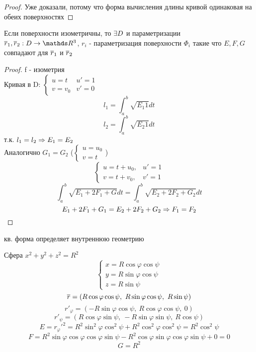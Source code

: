 \documentclass[12pt, fleqn]{article}
\begin{document}
  \begin{proof}
    Уже доказали, потому что форма вычисления длины кривой одинаковая на обеих поверхностях
  \end{proof}

  \begin{remark}
    Если поверхности изометричны, то $\exists D$ и параметризации $\ol{r}_1, \ol{r}_2: D \ra \R^3$, $r_i$ - параметризация поверхности $\Phi_i$ такие что $E,F,G$ совпадают для $\overline{r}_1$ и $\overline{r}_2$
  \end{remark}

  \begin{proof}
    f - изометрия\\
    Кривая в D: $\begin{cases}
      u = t & u'=1\\
      v=v_0  & v'=0
    \end{cases}$
    \[l_1 = \int_a^b \sqrt{E_1 1} dt\]
    \[l_2 = \int_a^b \sqrt{E_2 1} dt\]
    т.к. $l_1 = l_2 \Rightarrow E_1 = E_2$\\
    Аналогично $G_1 = G_2$ ($\begin{cases}
      u=u_0\\
      v=t
    \end{cases}$)
    \[\begin{cases}
      u = t + u_0, & u' = 1\\
      v = t + v_0, & v' = 1
    \end{cases}\]
    \[\int_a^b \sqrt{E_1 + 2 F_1 + G} dt = \int_a^b \sqrt{E_2 + 2F_2 + G_2} dt\]
    \[E_1 + 2F_1 + G_1 = E_2+ 2 F_2 + G_2 \Rightarrow F_1 = F_2\]
  \end{proof}

  \begin{consequence}
     кв. форма определяет внутреннюю геометрию
  \end{consequence}


  \begin{example}
    Сфера $x^2 + y^2 + z^2 = R^2$
    \[\begin{cases}
      x = R \cos\varphi \cos\psi\\
      y = R \sin\varphi \cos\psi\\
      z = R \sin\psi
    \end{cases}\]
    \[\overline{r} = (R \cos\varphi \cos\psi,\ R\sin\varphi \cos\psi,\ R \sin\psi)\]
    \[r'_{\varphi} = (-R \sin\varphi \cos\psi,\ R\cos\varphi \cos\psi,\ 0)\]
    \[r'_{\psi} = (R \cos\varphi \sin\psi,\ -R\sin\varphi \sin\psi,\ R \cos\psi)\]
    \[E = r_{\varphi}'^2 = R^2 \sin^2 \varphi \cos^2 \psi + R^2 \cos^2 \varphi \cos^2 \psi = R^2 \cos^2 \psi\]
    \[F = R^2 \sin\varphi \cos\varphi\cos\varphi\sin\psi - R^2 \cos\varphi \sin\varphi \cos\varphi \sin\psi + 0 = 0\]
    \[G = R^2\]
  \end{example}
\end{document}

